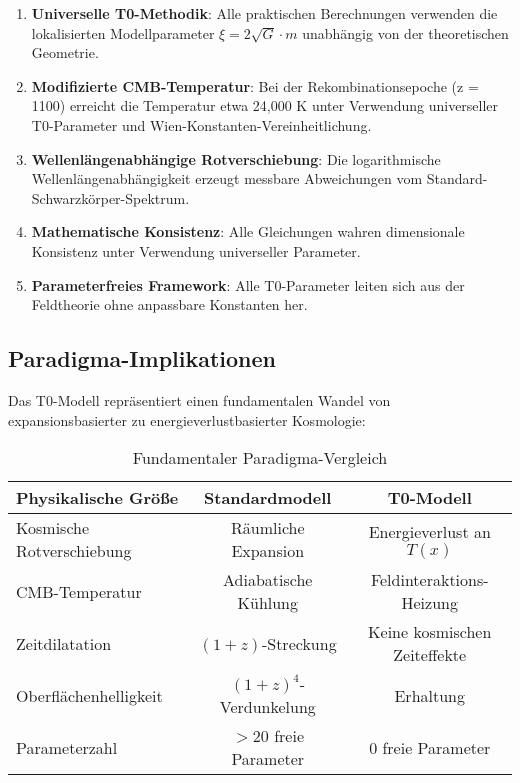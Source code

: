 \documentclass[12pt,a4paper]{article}
\newcommand{\Tfield}{T(x)}
\begin{document}
	\begin{enumerate}
		\item \textbf{Universelle T0-Methodik}: Alle praktischen Berechnungen verwenden die lokalisierten Modellparameter $\xi = 2\sqrt{G} \cdot m$ unabhängig von der theoretischen Geometrie.
		
		\item \textbf{Modifizierte CMB-Temperatur}: Bei der Rekombinationsepoche (z = 1100) erreicht die Temperatur etwa 24,000 K unter Verwendung universeller T0-Parameter und Wien-Konstanten-Vereinheitlichung.
		
		\item \textbf{Wellenlängenabhängige Rotverschiebung}: Die logarithmische Wellenlängenabhängigkeit erzeugt messbare Abweichungen vom Standard-Schwarzkörper-Spektrum.
		
		\item \textbf{Mathematische Konsistenz}: Alle Gleichungen wahren dimensionale Konsistenz unter Verwendung universeller Parameter.
		
		\item \textbf{Parameterfreies Framework}: Alle T0-Parameter leiten sich aus der Feldtheorie ohne anpassbare Konstanten her.
	\end{enumerate}
	
	\subsection{Paradigma-Implikationen}
	\label{subsec:paradigma_implikationen}
	
	Das T0-Modell repräsentiert einen fundamentalen Wandel von expansionsbasierter zu energieverlustbasierter Kosmologie:
	
	\begin{table}[htbp]
		\centering
		\begin{tabular}{|l|c|c|}
			\hline
			\textbf{Physikalische Größe} & \textbf{Standardmodell} & \textbf{T0-Modell} \\
			\hline
			Kosmische Rotverschiebung & Räumliche Expansion & Energieverlust an $\Tfield$ \\
			CMB-Temperatur & Adiabatische Kühlung & Feldinteraktions-Heizung \\
			Zeitdilatation & $(1+z)$-Streckung & Keine kosmischen Zeiteffekte \\
			Oberflächenhelligkeit & $(1+z)^4$-Verdunkelung & Erhaltung \\
			Parameterzahl & $>20$ freie Parameter & 0 freie Parameter \\
			\hline
		\end{tabular}
		\caption{Fundamentaler Paradigma-Vergleich}
		\label{tab:paradigma_vergleich}
	\end{table}
	
\end{document}

